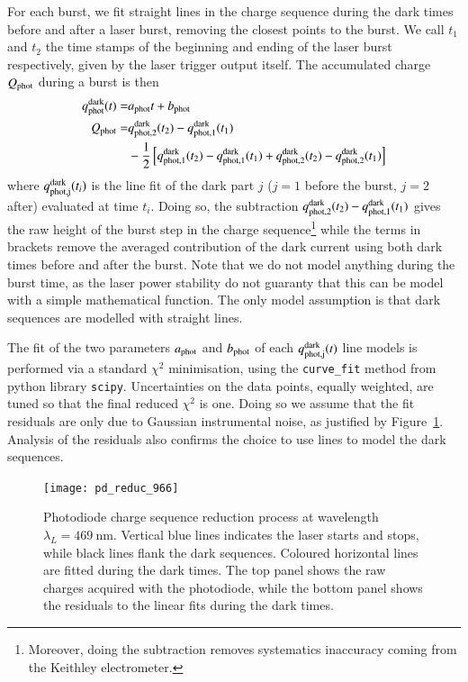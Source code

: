 For each burst, we fit straight lines in the charge sequence during the dark times before and after a laser burst, removing the closest points to the burst. We call $t_1$ and $t_2$ the time stamps of the beginning and ending of the laser burst respectively, given by the laser trigger output itself.%
The accumulated charge $Q_{\mathrm{phot}}$ during a burst is then
\begin{align}
q_{\rm phot}^{\rm dark}(t)  = & a_{\rm phot} t + b_{\rm phot} \\
Q_{\mathrm{phot}}  = & q_{\rm phot,2}^{\rm dark}(t_2) - q_{\rm phot,1}^{\rm dark}(t_1)\\ & - \frac{1}{2} \left[ q_{\rm phot,1}^{\rm dark}(t_2) -  q_{\rm phot,1}^{\rm dark}(t_1) + q_{\rm phot,2}^{\rm dark}(t_2) - q_{\rm phot,2}^{\rm dark}(t_1)  \right]   \notag 
\end{align}
where $q_{\rm phot,j}^{\rm dark}(t_i)$ is the line fit of the dark part $j$ ($j=1$ before the burst, $j=2$ after) evaluated at time $t_i$. Doing so, the subtraction $q_{\rm phot,2}^{\rm dark}(t_2) - q_{\rm phot,1}^{\rm dark}(t_1)$ gives the raw height of the burst step in the charge sequence\footnote{Moreover, doing the subtraction removes systematics inaccuracy coming from the Keithley electrometer.} while the terms in brackets remove the averaged contribution of the dark current using both dark times before and after the burst. Note that we do not model anything during the burst time, as the laser power stability do not guaranty that this can be model with a simple mathematical function. The only model assumption is that dark sequences are modelled with straight lines.

The fit of the two parameters $a_{\rm phot}$ and $b_{\rm phot}$ of each $q_{\rm phot,j}^{\rm dark}(t)$ line models is performed via a standard $\chi^2$ minimisation, using the \texttt{curve\_fit} method from python library \texttt{scipy}. Uncertainties on the data points, equally weighted, are tuned so that the final reduced $\chi^2$ is one. Doing so we assume that the fit residuals are only due to Gaussian instrumental noise, as justified by Figure~\ref{fig:pd_reduc}. Analysis of the residuals also confirms the choice to use lines to model the dark sequences.



\begin{figure}[!h]
\centering
\texttt{[image: pd\_reduc\_966]}
\caption{Photodiode charge sequence reduction process at wavelength $\lambda_L=\SI{469}{\nm}$. Vertical blue lines indicates the laser starts and stops, while black lines flank the dark sequences. Coloured horizontal lines are fitted during the dark times. The top panel shows the raw charges acquired with the photodiode, while the bottom panel shows the residuals to the linear fits during the dark times.}\label{fig:pd_reduc}
\end{figure}


